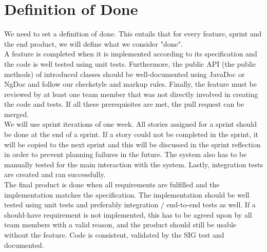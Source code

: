 \chapter{Definition of Done}
We need to set a definition of done.
This entails that for every feature, sprint and the end product, we will define what we consider "done".\\

A feature is completed when it is implemented according to its specification and the code is well tested using unit tests.
Furthermore, the public API (the public methods) of introduced classes should be well-documented using \gls{JavaDoc} or \gls{NgDoc} and follow our \gls{checkstyle} and markup rules.
Finally, the feature must be reviewed by at least one team member that was not directly involved in creating the code and tests.
If all these prerequisites are met, the pull request can be merged.\\

We will use sprint iterations of one week. All stories assigned for a sprint should be done at the end of a sprint.
If a story could not be completed in the sprint, it will be copied to the next sprint and this will be discussed in the sprint reflection in order to prevent planning failures in the future.
The system also has to be manually tested for the main interaction with the system. Lastly, integration tests are created and ran successfully.\\

The final product is done when all requirements are fulfilled and the implementation matches the specification. The implementation should be well tested using unit tests and preferably integration / end-to-end tests as well.
If a should-have requirement is not implemented, this has to be agreed upon by all team members with a valid reason, and the product should still be usable without the feature.
Code is consistent, validated by the \gls{SIG} test and documented.

